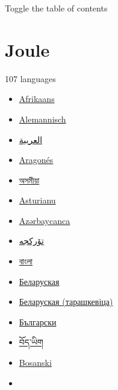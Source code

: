 \documentclass[
]{article}
\providecommand{\tightlist}{%
  \setlength{\itemsep}{0pt}\setlength{\parskip}{0pt}}
\begin{document}
\label{content}
\label{vector-page-titlebar-toc}
{} {Toggle the table of contents}

\label{vector-page-titlebar-toc-unpinned-container}

\section{\texorpdfstring{{Joule}}{Joule}}\label{firstHeading}

\label{p-lang-btn}
{} {107 languages}

\begin{itemize}
\tightlist
\item
  \href{https://af.wikipedia.org/wiki/Joule}{{Afrikaans}}
\item
  \href{https://als.wikipedia.org/wiki/Joule}{{Alemannisch}}
\item
  \href{https://ar.wikipedia.org/wiki/\%D8\%AC\%D9\%88\%D9\%84}{{العربية}}
\item
  \href{https://an.wikipedia.org/wiki/Joule}{{Aragonés}}
\item
  \href{https://as.wikipedia.org/wiki/\%E0\%A6\%9C\%E0\%A7\%81\%E0\%A6\%B2}{{অসমীয়া}}
\item
  \href{https://ast.wikipedia.org/wiki/Xuliu_(unid\%C3\%A1)}{{Asturianu}}
\item
  \href{https://az.wikipedia.org/wiki/Coul}{{Azərbaycanca}}
\item
  \href{https://azb.wikipedia.org/wiki/\%DA\%98\%D9\%88\%D9\%84}{{تۆرکجه}}
\item
  \href{https://bn.wikipedia.org/wiki/\%E0\%A6\%9C\%E0\%A7\%81\%E0\%A6\%B2}{{বাংলা}}
\item
  \href{https://be.wikipedia.org/wiki/\%D0\%94\%D0\%B6\%D0\%BE\%D1\%9E\%D0\%BB\%D1\%8C_(\%D0\%B0\%D0\%B4\%D0\%B7\%D1\%96\%D0\%BD\%D0\%BA\%D0\%B0_\%D0\%B2\%D1\%8B\%D0\%BC\%D1\%8F\%D1\%80\%D1\%8D\%D0\%BD\%D0\%BD\%D1\%8F)}{{Беларуская}}
\item
  \href{https://be-tarask.wikipedia.org/wiki/\%D0\%94\%D0\%B6\%D0\%BE\%D1\%9E\%D0\%BB\%D1\%8C}{{Беларуская
  (тарашкевіца)}}
\item
  \href{https://bg.wikipedia.org/wiki/\%D0\%94\%D0\%B6\%D0\%B0\%D1\%83\%D0\%BB}{{Български}}
\item
  \href{https://bo.wikipedia.org/wiki/\%E0\%BD\%85\%E0\%BD\%BC\%E0\%BD\%A3\%E0\%BC\%8D}{{བོད་ཡིག}}
\item
  \href{https://bs.wikipedia.org/wiki/D\%C5\%BEul}{{Bosanski}}
\item

\end{itemize}
\end{document}
